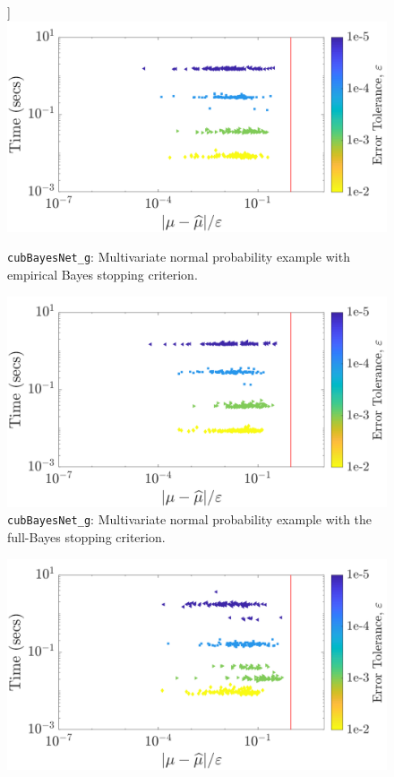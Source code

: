\documentclass{iitthesis}          %
\newcommand{\code}[1]{\texttt{#1}}
\begin{document}
{{{{{{\begin{figure}]
\centering
\includegraphics[width=0.95\linewidth]{"Sobol/Sobol_MVN_guaranteed_time_MLE__d2_r1_2019-Jun-17"}
\caption[Sobol: MVN guaranteed: MLE]{\code{cubBayesNet\_g}: Multivariate normal probability example with empirical Bayes stopping criterion.}
\label{fig:Sobol-mvn-guaranteed-MLE}
\end{figure}
\begin{figure}
\centering
\includegraphics[width=0.95\linewidth]{"Sobol/Sobol_MVN_guaranteed_time_full__d2_r1_2019-Jun-17"}
\caption[Sobol: MVN guaranteed: Full Bayes]{\code{cubBayesNet\_g}: Multivariate normal probability example with the full-Bayes stopping criterion.}
\label{fig:Sobol-mvn-guaranteed-FB}
\end{figure}
\begin{figure}
\centering
\includegraphics[width=0.95\linewidth]{"Sobol/Sobol_MVN_guaranteed_time_GCV__d2_r1_2019-Jun-17"}

\end{figure}}}}}}}
\end{document}
